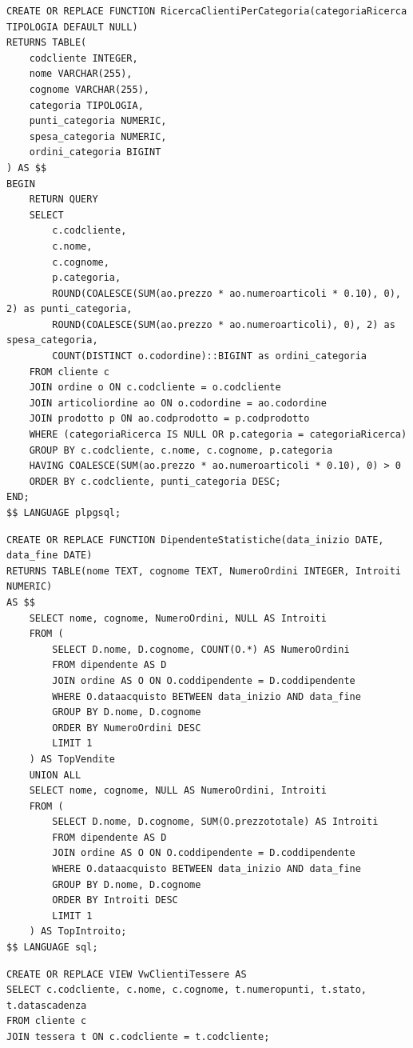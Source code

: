 \documentclass[a4paper,12pt]{article}
\begin{document}
\begin{lstlisting}[style=sqlstyle]
CREATE OR REPLACE FUNCTION RicercaClientiPerCategoria(categoriaRicerca TIPOLOGIA DEFAULT NULL)
RETURNS TABLE(
    codcliente INTEGER,
    nome VARCHAR(255),
    cognome VARCHAR(255),
    categoria TIPOLOGIA,
    punti_categoria NUMERIC,
    spesa_categoria NUMERIC,
    ordini_categoria BIGINT
) AS $$
BEGIN
    RETURN QUERY
    SELECT 
        c.codcliente,
        c.nome,
        c.cognome,
        p.categoria,
        ROUND(COALESCE(SUM(ao.prezzo * ao.numeroarticoli * 0.10), 0), 2) as punti_categoria,
        ROUND(COALESCE(SUM(ao.prezzo * ao.numeroarticoli), 0), 2) as spesa_categoria,
        COUNT(DISTINCT o.codordine)::BIGINT as ordini_categoria
    FROM cliente c
    JOIN ordine o ON c.codcliente = o.codcliente
    JOIN articoliordine ao ON o.codordine = ao.codordine
    JOIN prodotto p ON ao.codprodotto = p.codprodotto
    WHERE (categoriaRicerca IS NULL OR p.categoria = categoriaRicerca)
    GROUP BY c.codcliente, c.nome, c.cognome, p.categoria
    HAVING COALESCE(SUM(ao.prezzo * ao.numeroarticoli * 0.10), 0) > 0
    ORDER BY c.codcliente, punti_categoria DESC;
END;
$$ LANGUAGE plpgsql;
\end{lstlisting}

\begin{lstlisting}[style=sqlstyle]
CREATE OR REPLACE FUNCTION DipendenteStatistiche(data_inizio DATE, data_fine DATE)
RETURNS TABLE(nome TEXT, cognome TEXT, NumeroOrdini INTEGER, Introiti NUMERIC)
AS $$
    SELECT nome, cognome, NumeroOrdini, NULL AS Introiti
    FROM (
        SELECT D.nome, D.cognome, COUNT(O.*) AS NumeroOrdini
        FROM dipendente AS D
        JOIN ordine AS O ON O.coddipendente = D.coddipendente
        WHERE O.dataacquisto BETWEEN data_inizio AND data_fine
        GROUP BY D.nome, D.cognome
        ORDER BY NumeroOrdini DESC
        LIMIT 1
    ) AS TopVendite
    UNION ALL
    SELECT nome, cognome, NULL AS NumeroOrdini, Introiti
    FROM (
        SELECT D.nome, D.cognome, SUM(O.prezzototale) AS Introiti
        FROM dipendente AS D
        JOIN ordine AS O ON O.coddipendente = D.coddipendente
        WHERE O.dataacquisto BETWEEN data_inizio AND data_fine
        GROUP BY D.nome, D.cognome
        ORDER BY Introiti DESC
        LIMIT 1
    ) AS TopIntroito;
$$ LANGUAGE sql;
\end{lstlisting}

\begin{lstlisting}[style=sqlstyle]
CREATE OR REPLACE VIEW VwClientiTessere AS
SELECT c.codcliente, c.nome, c.cognome, t.numeropunti, t.stato, t.datascadenza
FROM cliente c
JOIN tessera t ON c.codcliente = t.codcliente;
\end{lstlisting}
\end{document}
